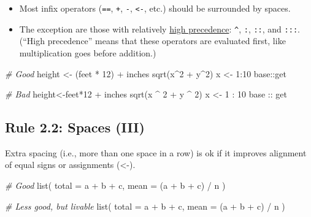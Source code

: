 \documentclass[
  letterpaper,
  DIV=11,
  numbers=noendperiod]{scrreprt}
\newenvironment{Shaded}{}{}
\newcommand{\AttributeTok}[1]{\textcolor[rgb]{0.49,0.56,0.16}{#1}}
\newcommand{\CommentTok}[1]{\textcolor[rgb]{0.38,0.63,0.69}{\textit{#1}}}
\newcommand{\DecValTok}[1]{\textcolor[rgb]{0.25,0.63,0.44}{#1}}
\newcommand{\FunctionTok}[1]{\textcolor[rgb]{0.02,0.16,0.49}{#1}}
\newcommand{\NormalTok}[1]{#1}
\newcommand{\OtherTok}[1]{\textcolor[rgb]{0.00,0.44,0.13}{#1}}
\newcommand{\SpecialCharTok}[1]{\textcolor[rgb]{0.25,0.44,0.63}{#1}}
\providecommand{\tightlist}{%
  \setlength{\itemsep}{0pt}\setlength{\parskip}{0pt}}\usepackage{longtable,booktabs,array}
\begin{document}
\begin{itemize}
\tightlist
\item
  Most infix operators (\texttt{==}, \texttt{+}, \texttt{-},
  \texttt{\textless{}-}, etc.) should be surrounded by spaces.
\item
  The exception are those with relatively
  \href{http://stat.ethz.ch/R-manual/R-patched/library/base/html/Syntax.html}{high
  precedence}: \texttt{\^{}}, \texttt{:}, \texttt{::}, and \texttt{:::}.
  (``High precedence'' means that these operators are evaluated first,
  like multiplication goes before addition.)
\end{itemize}

\begin{Shaded}
\begin{Highlighting}[]
\CommentTok{\# Good}
\NormalTok{height }\OtherTok{\textless{}{-}}\NormalTok{ (feet }\SpecialCharTok{*} \DecValTok{12}\NormalTok{) }\SpecialCharTok{+}\NormalTok{ inches}
\FunctionTok{sqrt}\NormalTok{(x}\SpecialCharTok{\^{}}\DecValTok{2} \SpecialCharTok{+}\NormalTok{ y}\SpecialCharTok{\^{}}\DecValTok{2}\NormalTok{)}
\NormalTok{x }\OtherTok{\textless{}{-}} \DecValTok{1}\SpecialCharTok{:}\DecValTok{10}
\NormalTok{base}\SpecialCharTok{::}\NormalTok{get}

\CommentTok{\# Bad}
\NormalTok{height}\OtherTok{\textless{}{-}}\NormalTok{feet}\SpecialCharTok{*}\DecValTok{12} \SpecialCharTok{+}\NormalTok{ inches}
\FunctionTok{sqrt}\NormalTok{(x }\SpecialCharTok{\^{}} \DecValTok{2} \SpecialCharTok{+}\NormalTok{ y }\SpecialCharTok{\^{}} \DecValTok{2}\NormalTok{)}
\NormalTok{x }\OtherTok{\textless{}{-}} \DecValTok{1} \SpecialCharTok{:} \DecValTok{10}
\NormalTok{base }\SpecialCharTok{::}\NormalTok{ get}
\end{Highlighting}
\end{Shaded}

\subsection{Rule 2.2: Spaces (III)}\label{rule-2.2-spaces-iii}

Extra spacing (i.e., more than one space in a row) is ok if it improves
alignment of equal signs or assignments (\textless-).

\begin{Shaded}
\begin{Highlighting}[]
\CommentTok{\# Good}
\FunctionTok{list}\NormalTok{(}
  \AttributeTok{total =}\NormalTok{ a }\SpecialCharTok{+}\NormalTok{ b }\SpecialCharTok{+}\NormalTok{ c,}
  \AttributeTok{mean  =}\NormalTok{ (a }\SpecialCharTok{+}\NormalTok{ b }\SpecialCharTok{+}\NormalTok{ c) }\SpecialCharTok{/}\NormalTok{ n}
\NormalTok{)}

\CommentTok{\# Less good, but livable}
\FunctionTok{list}\NormalTok{(}
  \AttributeTok{total =}\NormalTok{ a }\SpecialCharTok{+}\NormalTok{ b }\SpecialCharTok{+}\NormalTok{ c,}
  \AttributeTok{mean =}\NormalTok{ (a }\SpecialCharTok{+}\NormalTok{ b }\SpecialCharTok{+}\NormalTok{ c) }\SpecialCharTok{/}\NormalTok{ n}
\NormalTok{)}
\end{Highlighting}
\end{Shaded}
\end{document}
